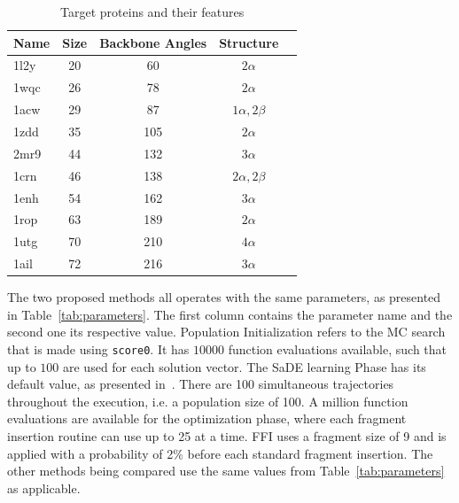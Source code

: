 \begin{table}[bh]
  \centering
  \begin{tabular}{ l | c | c | c | c }
    \hline \hline
    Name & Size & Backbone Angles & Structure         \\ \hline \hline
    1l2y & 20   & 60              & $2\alpha$         \\ \hline
    1wqc & 26   & 78              & $2\alpha$         \\ \hline
    1acw & 29   & 87              & $1\alpha, 2\beta$ \\ \hline
    1zdd & 35   & 105             & $2\alpha$         \\ \hline
    2mr9 & 44   & 132             & $3\alpha$         \\ \hline
    1crn & 46   & 138             & $2\alpha, 2\beta$ \\ \hline
    1enh & 54   & 162             & $3\alpha$         \\ \hline
    1rop & 63   & 189             & $2\alpha$         \\ \hline
    1utg & 70   & 210             & $4\alpha$         \\ \hline
    1ail & 72   & 216             & $3\alpha$         \\ \hline
    \hline
  \end{tabular}
  \caption{Target proteins and their features}
  \label{tab:protein-targets}
\end{table}

The two proposed methods all operates with the same parameters, as presented
in Table~\ref{tab:parameters}. The first column contains the parameter name and the
second one its respective value.
Population Initialization refers to the \ac{MC} search that is made using
\texttt{score0}. It has $10000$ function evaluations available, such that up to
$100$ are used for each solution vector.
The SaDE learning Phase has its default value,
as presented in~\cite{qin2009differential}. There are 100 simultaneous
trajectories throughout the execution, i.e. a population size of 100. A million
function evaluations are available for the optimization phase, where each
fragment insertion routine can use up to 25 at a time. \ac{FFI} uses a fragment
size of 9 and is applied with a probability of 2\% before each standard fragment
insertion. The other methods being compared use the same values from
Table~\ref{tab:parameters} as applicable.

